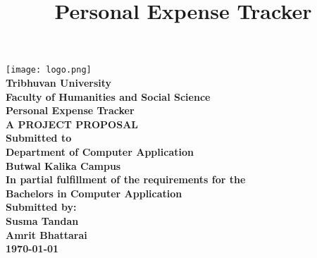 \documentclass[12pt]{report} %
\title{Personal Expense Tracker}
\author{} %
\date{}   %
\begin{document}
\thispagestyle{empty} %
\begin{center}
    \texttt{[image: logo.png]} \\[1.0cm] %
    

    \Large \textbf{Tribhuvan University} \\[0.1cm]
    \Large \textbf {Faculty of Humanities and Social Science} \\[1.1cm]

    

    \large \textbf{Personal Expense Tracker} \\[1.2cm]
     \textbf{A PROJECT PROPOSAL} \\[1.2cm]

    

    \large \textbf{Submitted to}  \\[0.1cm]
    \large \textbf {Department of Computer Application} \\[0.1cm]
    \large \textbf {Butwal Kalika Campus} \\[1.1cm]


    

    \textbf{In partial fulfillment of the requirements for the} \\[0.1cm]
    \textbf{Bachelors in Computer Application} \\[1.1cm]



    \large \textbf{Submitted by:}  \\[0.2cm]
    \textbf{Susma Tandan} \\[0cm]
    \textbf{Amrit Bhattarai} \\[1.2cm]
    

    \Large \textbf {\today}
\end{center}
\newpage

\pagestyle{plain} %

\centering\renewcommand{\contentsname}{\Huge \bfseries Table of Contents}
\tableofcontents
\newpage
{}
\end{document}

